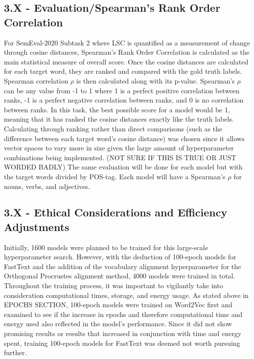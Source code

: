 \subsection{3.X - Evaluation/Spearman's Rank Order Correlation}
For SemEval-2020 Subtask 2 where LSC is quantified as a measurement of change through cosine distances, Spearman’s Rank Order Correlation is calculated as the main statistical measure of overall score. Once the cosine distances are calculated for each target word, they are ranked and compared with the gold truth labels. Spearman correlation $\rho$ is then calculated along with its p-value. Spearman’s $\rho$ can be any value from -1 to 1 where 1 is a perfect positive correlation between ranks, -1 is a perfect negative correlation between ranks, and 0 is no correlation between ranks. In this task, the best possible score for a model would be 1, meaning that it has ranked the cosine distances exactly like the truth labels. Calculating through ranking rather than direct comparisons (such as the difference between each target word’s cosine distance) was chosen since it allows vector spaces to vary more in size given the large amount of hyperparameter combinations being implemented. (NOT SURE IF THIS IS TRUE OR JUST WORDED BADLY) The same evaluation will be done for each model but with the target words divided by POS-tag. Each model will have a Spearman’s $\rho$ for nouns, verbs, and adjectives. 

\subsection{3.X - Ethical Considerations and Efficiency Adjustments}
Initially, 1600 models were planned to be trained for this large-scale hyperparameter search. However, with the deduction of 100-epoch models for FastText and the addition of the vocabulary alignment hyperparameter for the Orthogonal Procrustes alignment method, 4000 models were trained in total. Throughout the training process, it was important to vigilantly take into consideration computational times, storage, and energy usage. As stated above in EPOCHS SECTION, 100-epoch models were trained on Word2Vec first and examined to see if the increase in epochs and therefore computational time and energy used also reflected in the model’s performance. Since it did not show promising results or results that increased in conjunction with time and energy spent, training 100-epoch models for FastText was deemed not worth pursuing further. 

